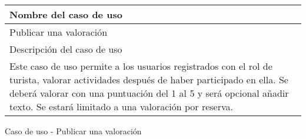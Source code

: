 \begin{identificacionCasoDeUso}
	\begin{tabular} { | p{17cm} |}

		\hline
		Nombre del caso de uso                                                                                                                                                                                                                                              \\ \hline
		Publicar una valoración                                                                                                                                                                                                                                             \\ \hline
		Descripción del caso de uso                                                                                                                                                                                                                                         \\ \hline
		Este caso de uso permite a los usuarios registrados con el rol de turista, valorar actividades después de haber participado en ella. Se deberá valorar con una puntuación del 1 al 5 y será opcional añadir texto. Se estará limitado a una valoración por reserva. \\ \hline
	\end{tabular}
	\caption{Caso de uso - Publicar una valoración}
\end{identificacionCasoDeUso}